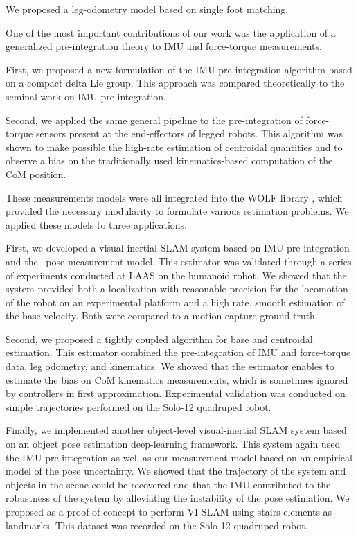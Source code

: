 We proposed a leg-odometry model based on single foot matching.

One of the most important contributions of our work was the application of a generalized pre-integration theory to IMU and force-torque measurements. 

First, we proposed a new formulation of the IMU pre-integration algorithm based on a compact delta Lie group. This approach was compared
theoretically to the seminal work on IMU pre-integration. 

Second, we applied the same general pipeline to the pre-integration of
force-torque sensors present at the end-effectors of legged robots. This algorithm was shown to make possible the high-rate estimation of centroidal 
quantities and to observe a bias on the traditionally used kinematics-based computation of the CoM position.   

\bigskip

These measurements models were all integrated into the WOLF library \cite{sola2021wolf}, which provided the necessary modularity to formulate various estimation
problems. We applied these models to three applications.

\bigskip

First, we developed a visual-inertial SLAM system based on IMU pre-integration and the \apriltag\ pose measurement model. This estimator was validated through
a series of experiments conducted at LAAS on the  humanoid robot. We showed that the system provided both a localization with reasonable precision
for the locomotion of the robot on an experimental platform and a high rate, smooth estimation of the base velocity. Both were compared to a motion capture 
ground truth. 

Second, we proposed a tightly coupled algorithm for base and centroidal estimation. This estimator combined the pre-integration of IMU and force-torque data, 
leg odometry, and kinematics. We showed that the estimator enables to estimate the bias on CoM kinematics measurements, which is sometimes ignored
by controllers in first approximation. Experimental validation was conducted on simple trajectories performed on the Solo-12 quadruped robot. 

Finally, we implemented another object-level visual-inertial SLAM system based on an object pose estimation deep-learning framework. This system again used the 
IMU pre-integration as well as our measurement model based on an empirical model of the pose uncertainty. We showed that the trajectory of the system and objects
in the scene could be recovered and that the IMU contributed to the robustness of the system by alleviating the instability of the pose estimation. We proposed
as a proof of concept to perform VI-SLAM using stairs elements as landmarks. This dataset was recorded on the Solo-12 quadruped robot.


